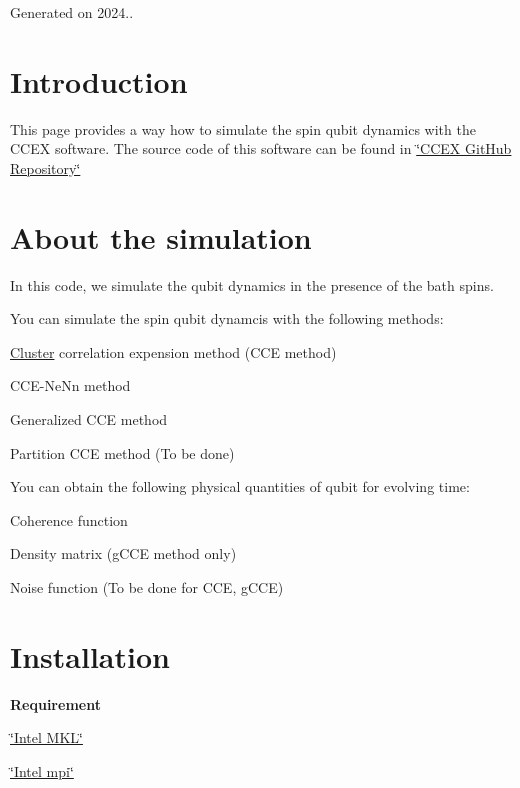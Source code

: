Generated on 2024..\hypertarget{index_Introduction}{}\section{Introduction}\label{index_Introduction}
This page provides a way how to simulate the spin qubit dynamics with the C\-C\-E\-X software. The source code of this software can be found in \hyperlink{}{\char`\"{}\-C\-C\-E\-X Git\-Hub Repository\char`\"{} }\hypertarget{index_AboutTheSimulation}{}\section{About the simulation}\label{index_AboutTheSimulation}
In this code, we simulate the qubit dynamics in the presence of the bath spins.

You can simulate the spin qubit dynamcis with the following methods\-:
\begin{DoxyItemize}
\item \hyperlink{structCluster}{Cluster} correlation expension method (C\-C\-E method)
\item C\-C\-E-\/\-Ne\-Nn method
\item Generalized C\-C\-E method
\item Partition C\-C\-E method (To be done)
\end{DoxyItemize}

You can obtain the following physical quantities of qubit for evolving time\-:
\begin{DoxyItemize}
\item Coherence function
\item Density matrix (g\-C\-C\-E method only)
\item Noise function (To be done for C\-C\-E, g\-C\-C\-E)
\end{DoxyItemize}\hypertarget{index_Installation}{}\section{Installation}\label{index_Installation}



{\bfseries Requirement} {\bfseries } 
\begin{DoxyItemize}
\item \hyperlink{}{\char`\"{}\-Intel M\-K\-L\char`\"{} }
\item \hyperlink{}{\char`\"{}\-Intel mpi\char`\"{} }
\end{DoxyItemize}

